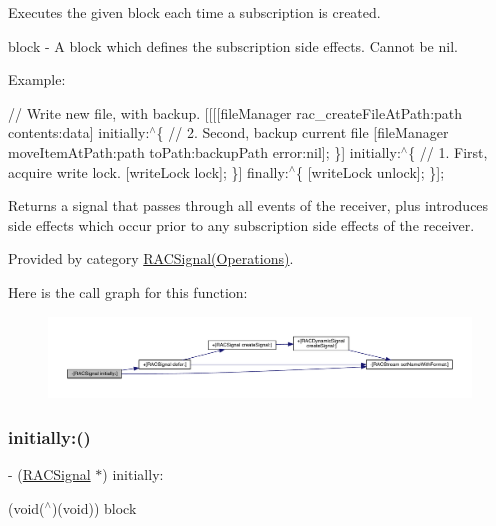 Executes the given block each time a subscription is created.

block -\/ A block which defines the subscription side effects. Cannot be {\ttfamily nil}.

Example\+:

// Write new file, with backup. \mbox{[}\mbox{[}\mbox{[}\mbox{[}file\+Manager rac\+\_\+create\+File\+At\+Path\+:path contents\+:data\mbox{]} initially\+:$^\wedge$\{ // 2. Second, backup current file \mbox{[}file\+Manager move\+Item\+At\+Path\+:path to\+Path\+:backup\+Path error\+:nil\mbox{]}; \}\mbox{]} initially\+:$^\wedge$\{ // 1. First, acquire write lock. \mbox{[}write\+Lock lock\mbox{]}; \}\mbox{]} finally\+:$^\wedge$\{ \mbox{[}write\+Lock unlock\mbox{]}; \}\mbox{]};

Returns a signal that passes through all events of the receiver, plus introduces side effects which occur prior to any subscription side effects of the receiver. 

Provided by category \mbox{\hyperlink{category_r_a_c_signal_07_operations_08_a2c8566a5d3b5997357d34ee5991a2e0c}{R\+A\+C\+Signal(\+Operations)}}.

Here is the call graph for this function\+:\nopagebreak
\begin{figure}[H]
\begin{center}
\leavevmode
\includegraphics[width=350pt]{interface_r_a_c_signal_a2c8566a5d3b5997357d34ee5991a2e0c_cgraph}
\end{center}
\end{figure}
\mbox{\label{interface_r_a_c_signal_a2c8566a5d3b5997357d34ee5991a2e0c}} 
\subsubsection{\texorpdfstring{initially\+:()}{initially:()}\hspace{0.1cm}{\footnotesize\ttfamily [2/3]}}
{\footnotesize\ttfamily -\/ (\mbox{\hyperlink{interface_r_a_c_signal}{R\+A\+C\+Signal}} $\ast$) initially\+: \begin{DoxyParamCaption}\item[{(void($^\wedge$)(void))}]{block }\end{DoxyParamCaption}}

